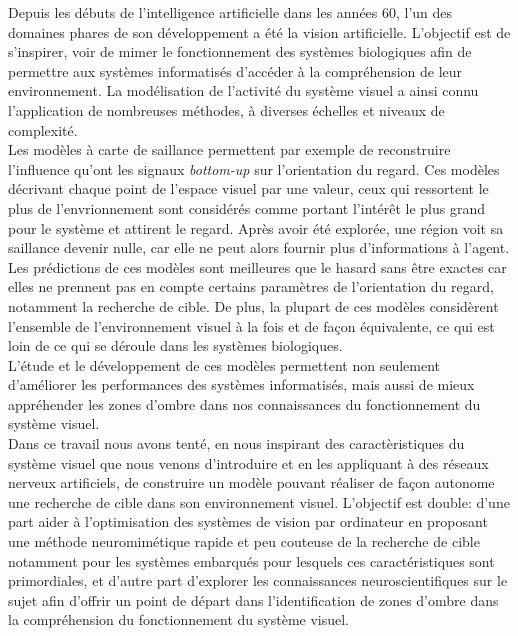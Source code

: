 
Depuis les débuts de l'intelligence artificielle dans les années 60, l'un des domaines phares de son développement a été la vision artificielle. L'objectif est de s'inspirer, voir de mimer le fonctionnement des systèmes biologiques afin de permettre aux systèmes informatisés d'accéder à la compréhension de leur environnement.
La modélisation de l'activité du système visuel a ainsi connu l'application de nombreuses méthodes, à diverses échelles et niveaux de complexité.\autocite{Werner2014} \\
Les modèles à carte de saillance permettent par exemple de reconstruire l'influence qu'ont les signaux \textit{bottom-up} sur l'orientation du regard. 
Ces modèles décrivant chaque point de l'espace visuel par une valeur, ceux qui ressortent le plus de l'envrionnement sont considérés comme portant l'intérêt le plus grand pour le système et attirent le regard. 
Après avoir été explorée, une région voit sa saillance devenir nulle, car elle ne peut alors fournir plus d'informations à l'agent.
Les prédictions de ces modèles sont meilleures que le hasard sans être exactes car elles ne prennent pas en compte certains paramètres de l'orientation du regard, notamment la recherche de cible. 
De plus, la plupart de ces modèles considèrent l'ensemble de l'environnement visuel à la fois et de façon équivalente, ce qui est loin de ce qui se déroule dans les systèmes biologiques. \autocite{Werner2014} \\

L'étude et le développement de ces modèles permettent non seulement d'améliorer les performances des systèmes informatisés, mais aussi de mieux appréhender les zones d'ombre dans nos connaissances du fonctionnement du système visuel. \autocite{Werner2014} \\

Dans ce travail nous avons tenté, en nous inspirant des caractèristiques du système visuel que nous venons d'introduire et en les appliquant à des réseaux nerveux artificiels, de construire un modèle pouvant réaliser de façon autonome une recherche de cible dans son environnement visuel.
L'objectif est double: d'une part aider à l'optimisation des systèmes de vision par ordinateur en proposant une méthode neuromimétique rapide et peu couteuse de la recherche de cible notamment pour les systèmes embarqués pour lesquels ces caractéristiques sont primordiales, et d'autre part d'explorer les connaissances neuroscientifiques sur le sujet afin d'offrir un point de départ dans l'identification de zones d'ombre dans la compréhension du fonctionnement du système visuel.